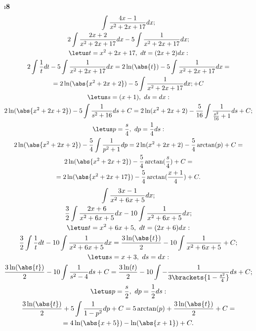 \i \textbf{8}
\pu
\begin{gather*}
    \int \frac{4x-1}{x^2 + 2x + 17}dx;\\
    2\int \frac{2x+2}{x^2 + 2x + 17}dx - 5\int \frac{1}{x^2 + 2x + 17}dx;\\
    \letus t = x^2 + 2x + 17,\ dt = (2x+2) dx:\\
    2\int \frac{1}{t}dt - 5\int \frac{1}{x^2 + 2x+ 17}dx = 2\ln(\abs{t}) - 5\int \frac{1}{x^2 + 2x + 17}dx =\\
    = 2\ln(\abs{x^2 + 2x+2}) - 5\int\frac{1}{x^2 + 2x + 17}dx; + C\\
    \letus s = (x+1),\ ds = dx:\\
    2\ln(\abs{x^2 + 2x+2}) - 5\int \frac{1}{s^2 + 16}ds + C = 2\ln(x^2 + 2x+2) - \frac{5}{16}\int \frac{1}{\frac{s^2}{16} + 1}ds + C;\\
    \letus p = \frac{s}{4},\ dp = \frac{1}{4}ds:\\
    2\ln(\abs{x^2 + 2x+2}) - \frac{5}{4}\int \frac{1}{p^2 + 1}dp = 2\ln(x^2 + 2x+2) - \frac{5}{4}\arctan(p) + C = \\ 
    2\ln(\abs{x^2 + 2x+2}) - \frac{5}{4}\arctan(\frac{s}{4}) + C = \\
    = 2\ln(\abs{x^2 + 2x + 17}) - \frac{5}{4}\arctan(\frac{x+1}{4}) + C.
\end{gather*}
\pu
\begin{gather*}
    \int \frac{3x - 1}{x^2 + 6x + 5}dx;\\
    \frac{3}{2}\int \frac{2x+6}{x^2 + 6x + 5}dx - 10\int \frac{1}{x^2 + 6x + 5}dx;\\
    \letus t = x^2 + 6x + 5,\ dt = (2x+6)dx:\\
    \frac{3}{2}\int \frac{1}{t}dt - 10\int \frac{1}{x^2 + 6x + 5}dx = \frac{3\ln(\abs{t})}{2} - 10\int \frac{1}{x^2 + 6x + 5} + C;\\
    \letus s = x + 3,\ ds = dx:\\
    \frac{3\ln(\abs{t})}{2} - 10\int \frac{1}{s^2 - 4}ds + C = \frac{3\ln(t)}{2} - 10\int -\frac{1}{3\brackets{1-\frac{s^2}{4}}}ds + C;\\
    \letus p = \frac{s}{2},\ dp = \frac{1}{2}ds:\\
    \frac{3\ln(\abs{t})}{2} + 5\int \frac{1}{1-p^2}dp + C = 5\arctan(p) + \frac{3\ln(\abs{t})}{2} + C = \\
    = 4\ln(\abs{x+5}) - \ln(\abs{x+1}) + C.
\end{gather*}

